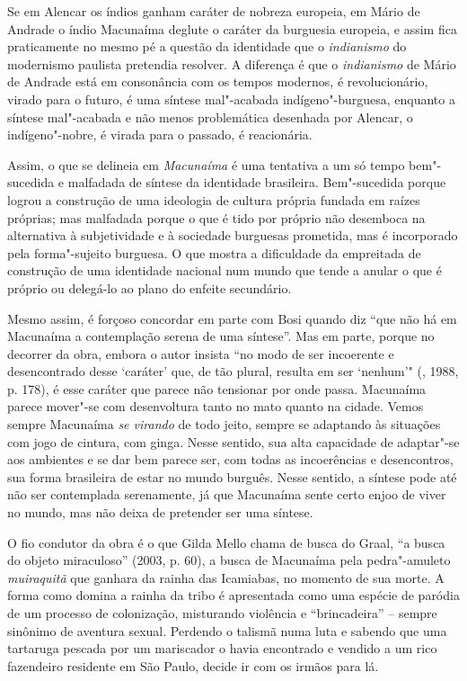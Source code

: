 {Se em Alencar os índios ganham caráter de nobreza europeia, em Mário de
Andrade o índio Macunaíma deglute o caráter da burguesia europeia, e
assim fica praticamente no mesmo pé a questão da identidade que o
\emph{indianismo} do modernismo paulista pretendia resolver. A diferença
é que o \emph{indianismo} de Mário de Andrade está em consonância com os
tempos modernos, é revolucionário, virado para o futuro, é uma síntese
mal"-acabada indígeno"-burguesa, enquanto a síntese mal"-acabada e não
menos problemática desenhada por Alencar, o indígeno"-nobre, é virada
para o passado, é reacionária.

Assim, o que se delineia em \emph{Macunaíma} é uma tentativa a um só
tempo bem"-sucedida e malfadada de síntese da identidade brasileira.
Bem"-sucedida porque logrou a construção de uma ideologia de cultura
própria fundada em raízes próprias; mas malfadada porque o que é tido
por próprio não desemboca na alternativa à subjetividade e à sociedade
burguesas prometida, mas é incorporado pela forma"-sujeito burguesa. O
que mostra a dificuldade da empreitada de construção de uma identidade
nacional num mundo que tende a anular o que é próprio ou delegá-lo ao
plano do enfeite secundário.

Mesmo assim, é forçoso concordar em parte com Bosi quando diz ``que não
há em Macunaíma a contemplação serena de uma síntese''. Mas em parte, porque
no decorrer da obra, embora o autor insista ``no modo de ser incoerente
e desencontrado desse `caráter' que, de tão plural, resulta em ser
`nenhum'" (, 1988, p. 178), é esse caráter que parece não tensionar
por onde passa. Macunaíma parece mover"-se com desenvoltura tanto no mato
quanto na cidade. Vemos sempre Macunaíma \emph{se virando} de todo
jeito, sempre se adaptando às situações com jogo de cintura, com ginga.
Nesse sentido, sua alta capacidade de adaptar"-se aos ambientes e se dar
bem parece ser, com todas as incoerências e desencontros, sua forma
brasileira de estar no mundo burguês. Nesse sentido, a síntese pode até
não ser contemplada serenamente, já que Macunaíma sente certo enjoo de
viver no mundo, mas não deixa de pretender ser uma síntese.

O fio condutor da obra é o que Gilda Mello chama de busca do Graal, ``a
busca do objeto miraculoso'' (2003, p. 60), a busca de Macunaíma pela
pedra"-amuleto \emph{muiraquitã} que ganhara da rainha das Icamiabas, no
momento de sua morte. A forma como domina a rainha da tribo é
apresentada como uma espécie de paródia de um processo de colonização,
misturando violência e ``brincadeira'' -- sempre sinônimo de aventura
sexual. Perdendo o talismã numa luta e sabendo que uma tartaruga pescada
por um mariscador o havia encontrado e vendido a um rico fazendeiro
residente em São Paulo, decide ir com os irmãos para lá.

}
